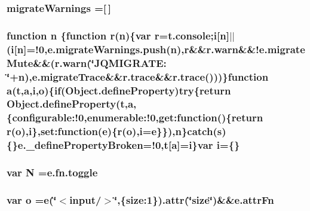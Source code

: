 \hypertarget{jquery-migrate-1_82_81_8min_8js_a0242427f8bf1d2c38898b0e4b81ffb2c}{
\subsubsection[{migrate\-Warnings}]{ migrate\-Warnings =\mbox{[}$\,$\mbox{]}}}\label{jquery-migrate-1_82_81_8min_8js_a0242427f8bf1d2c38898b0e4b81ffb2c}
\hypertarget{jquery-migrate-1_82_81_8min_8js_afc984c4f6c68ce30a0af99006f5f8d27}{
\subsubsection[{n}]{\setlength{\rightskip}{0pt plus 5cm}function n \{function {\bf r}(n)\{var {\bf r}=t.\-console;{\bf i}\mbox{[}n\mbox{]}$\vert$$\vert$({\bf i}\mbox{[}n\mbox{]}=!0,e.\-migrate\-Warnings.\-push(n),{\bf r}\&\&r.\-warn\&\&!{\bf e.\-migrate\-Mute}\&\&(r.\-warn(\char`\"{}J\-Q\-M\-I\-G\-R\-A\-T\-E\-: \char`\"{}+n),{\bf e.\-migrate\-Trace}\&\&r.\-trace\&\&r.\-trace()))\}function {\bf a}({\bf t},{\bf a},{\bf i},{\bf o})\{{\bf if}(Object.\-define\-Property){\bf try}\{return Object.\-define\-Property({\bf t},{\bf a},\{configurable\-:!0,enumerable\-:!0,get\-:function()\{return {\bf r}({\bf o}),{\bf i}\},set\-:function({\bf e})\{{\bf r}({\bf o}),{\bf i}={\bf e}\}\}),n\}{\bf catch}({\bf s})\{\}e.\-\_\-define\-Property\-Broken=!0,{\bf t}\mbox{[}{\bf a}\mbox{]}={\bf i}\}var {\bf i}=\{\}}}\label{jquery-migrate-1_82_81_8min_8js_afc984c4f6c68ce30a0af99006f5f8d27}
\hypertarget{jquery-migrate-1_82_81_8min_8js_abadc8a6494eb0561422367930ee2c126}{
\subsubsection[{N}]{\setlength{\rightskip}{0pt plus 5cm}var N ={\bf e.\-fn.\-toggle}}}\label{jquery-migrate-1_82_81_8min_8js_abadc8a6494eb0561422367930ee2c126}
\hypertarget{jquery-migrate-1_82_81_8min_8js_a400dc8109620963da8314d4bdfa14f83}{
\subsubsection[{o}]{\setlength{\rightskip}{0pt plus 5cm}var o ={\bf e}(\char`\"{}$<$input/$>$\char`\"{},\{size\-:1\}).{\bf attr}(\char`\"{}size\char`\"{})\&\&e.\-attr\-Fn}}\label{jquery-migrate-1_82_81_8min_8js_a400dc8109620963da8314d4bdfa14f83}

